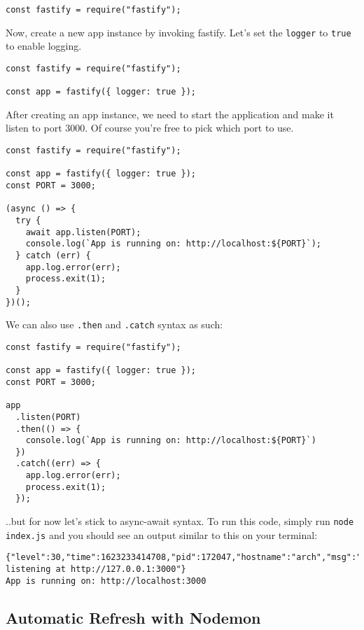 \documentclass[a4paper,14pt,titlepage]{article}
\def\c#1{\texttt{#1}}
\begin{document}
\begin{verbatim}
const fastify = require("fastify");
\end{verbatim}

Now, create a new app instance by invoking fastify. Let's set the
\c{logger} to
\c{true} to enable logging.

\begin{verbatim}
const fastify = require("fastify");

const app = fastify({ logger: true });
\end{verbatim}

After creating an app instance, we need to start the application and make it
listen to port 3000. Of course you're free to pick which port to use.

\begin{verbatim}
const fastify = require("fastify");

const app = fastify({ logger: true });
const PORT = 3000;

(async () => {
  try {
    await app.listen(PORT);
    console.log(`App is running on: http://localhost:${PORT}`);
  } catch (err) {
    app.log.error(err);
    process.exit(1);
  }
})();
\end{verbatim}

\newpage

We can also use \texttt{.then} and
\texttt{.catch} syntax as such:

\begin{verbatim}
const fastify = require("fastify");

const app = fastify({ logger: true });
const PORT = 3000;

app
  .listen(PORT)
  .then(() => {
    console.log(`App is running on: http://localhost:${PORT}`)
  })
  .catch((err) => {
    app.log.error(err);
    process.exit(1);
  });
\end{verbatim}

..but for now let's stick to async-await syntax.  To run this code,
simply run \c{node index.js} and you should see an output similar to this
on your terminal:

\begin{verbatim}
{"level":30,"time":1623233414708,"pid":172047,"hostname":"arch","msg":"Server listening at http://127.0.0.1:3000"}
App is running on: http://localhost:3000
\end{verbatim}

\subsection{Automatic Refresh with Nodemon}
\end{document}
